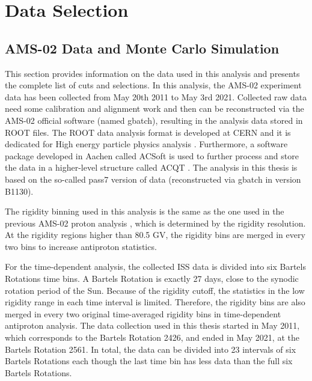 
\section{Data Selection} \label{DataSelectionSection}

\subsection{AMS-02 Data and Monte Carlo Simulation}

This section provides information on the data used in this analysis and presents the complete list of cuts and selections. In this analysis, the AMS-02 experiment data has been collected from May 20th 2011 to May 3rd 2021. Collected raw data need some calibration and alignment work and then can be reconstructed via the AMS-02 official software (named gbatch), resulting in the analysis data stored in ROOT files. The ROOT data analysis format is developed at CERN and it is dedicated for High energy particle physics analysis \cite{CERNROOTPaper}. Furthermore, a software package developed in Aachen called ACSoft is used to further process and store the data in a higher-level structure called ACQT \cite{BastianPhDPaper}. The analysis in this thesis is based on the so-called pass7 version of data (reconstructed via gbatch in version B1130). \par

The rigidity binning used in this analysis is the same as the one used in the previous AMS-02 proton analysis \cite{AMS02ProtonPaper}, which is determined by the rigidity resolution. At the rigidity regions higher than 80.5 GV, the rigidity bins are merged in every two bins to increase antiproton statistics.  \par


For the time-dependent analysis, the collected ISS data is divided into six Bartels Rotations time bins. A Bartels Rotation is exactly 27 days, close to the synodic rotation period of the Sun. Because of the rigidity cutoff, the statistics in the low rigidity range in each time interval is limited. Therefore, the rigidity bins are also merged in every two original time-averaged rigidity bins in time-dependent antiproton analysis. The data collection used in this thesis started in May 2011, which corresponds to the Bartels Rotation 2426, and ended in May 2021, at the Bartels Rotation 2561. In total, the data can be divided into 23 intervals of six Bartels Rotations each though the last time bin has less data than the full six Bartels Rotations.  \par

